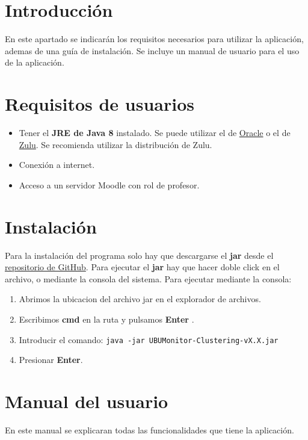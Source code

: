 
\section{Introducción}
En este apartado se indicarán los requisitos necesarios para utilizar la aplicación, ademas de una guía de instalación. Se incluye un manual de usuario para el uso de la aplicación.

\section{Requisitos de usuarios}
\begin{itemize}
	\item Tener el \textbf{JRE de Java 8} instalado. Se puede utilizar el de \href{https://www.java.com/es/download/}{Oracle} o el de \href{https://www.azul.com/downloads/zulu-community/?version=java-8-lts&os=windows&architecture=x86-64-bit&package=jre}{Zulu}. Se recomienda utilizar la distribución de Zulu.
	\item Conexión a internet.
	\item Acceso a un servidor Moodle con rol de profesor.
\end{itemize}
\section{Instalación}
Para la instalación del programa solo hay que descargarse el \textbf{jar} desde el \href{https://github.com/xjx1001/UBUMonitor/releases/latest}{repositorio de GitHub}.
Para ejecutar el \textbf{jar} hay que hacer doble click en el archivo, o mediante la consola del sistema. Para ejecutar mediante la consola:
\begin{enumerate}
	\item Abrimos la ubicacion del archivo jar en el explorador de archivos.
	\item Escribimos \textbf{cmd} en la ruta y pulsamos \textbf{Enter} .
	\item Introducir el comando: \texttt{java -jar UBUMonitor-Clustering-vX.X.jar}
	\item Presionar \textbf{Enter}.
\end{enumerate}

\section{Manual del usuario}
En este manual se explicaran todas las funcionalidades que tiene la aplicación.


